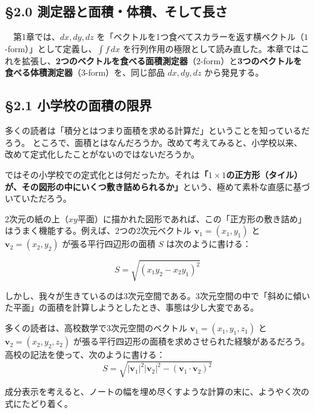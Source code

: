 \documentclass[a4paper,12pt,openany]{book}
\begin{document}
\hypertarget{ux6e2cux5b9aux5668ux3068ux9762ux7a4dux4f53ux7a4dux305dux3057ux3066ux9577ux3055}{%
\subsection{§2.0
測定器と面積・体積、そして長さ}\label{ux6e2cux5b9aux5668ux3068ux9762ux7a4dux4f53ux7a4dux305dux3057ux3066ux9577ux3055}}

　第1章では、\(dx, dy, dz\)
を「ベクトルを1つ食べてスカラーを返す横ベクトル（\(1\)-form）」として定義し、\(\int f\,dx\)
を行列作用の極限として読み直した。本章ではこれを拡張し、\textbf{2つのベクトルを食べる面積測定器}（\(2\)-form）と\textbf{3つのベクトルを食べる体積測定器}（\(3\)-form）を、同じ部品
\(dx, dy, dz\) から発見する。

\hypertarget{ux5c0fux5b66ux6821ux306eux9762ux7a4dux306eux9650ux754c}{%
\subsection{§2.1
小学校の面積の限界}\label{ux5c0fux5b66ux6821ux306eux9762ux7a4dux306eux9650ux754c}}

多くの読者は「積分とはつまり面積を求める計算だ」ということを知っているだろう。
ところで、面積とはなんだろうか。改めて考えてみると、小学校以来、改めて定式化したことがないのではないだろうか。

ではその小学校での定式化とは何だったか。それは\textbf{「}\(1 \times 1\)\textbf{の正方形（タイル）が、その図形の中にいくつ敷き詰められるか」}という、極めて素朴な直感に基づいていただろう。

2次元の紙の上（\(xy\)平面）に描かれた図形であれば、この「正方形の敷き詰め」はうまく機能する。例えば、2つの2次元ベクトル
\(\mathbf{v}_1 = (x_1, y_1)\) と \(\mathbf{v}_2 = (x_2, y_2)\)
が張る平行四辺形の面積 \(S\) は次のように書ける：

\[S = \sqrt{(x_1 y_2 - x_2 y_1)^2}\]

しかし、我々が生きているのは3次元空間である。3次元空間の中で「斜めに傾いた平面」の面積を計算しようとしたとき、事態は少し大変である。

多くの読者は、高校数学で3次元空間のベクトル
\(\mathbf{v}_1 = (x_1, y_1, z_1)\) と \(\mathbf{v}_2 = (x_2, y_2, z_2)\)
が張る平行四辺形の面積を求めさせられた経験があるだろう。高校の記法を使って、次のように書ける：
\[
S = \sqrt{|\mathbf{v}_1|^2 |\mathbf{v}_2|^2 - (\mathbf{v}_1 \cdot \mathbf{v}_2)^2}
\]

成分表示を考えると、ノートの幅を埋め尽くすような計算の末に、ようやく次の式にたどり着く。
\end{document}
